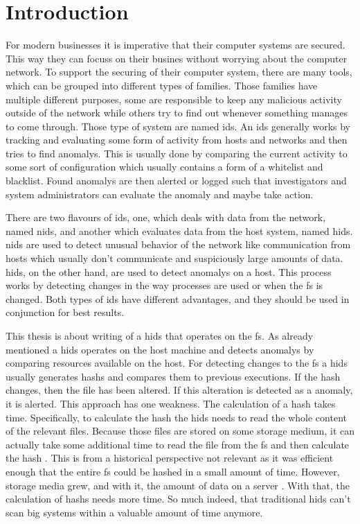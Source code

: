 \chapter{Introduction}

For modern businesses it is imperative that their computer systems are secured. This way they can focuss on their busines without worrying about the computer network. To support the securing of their computer system, there are many tools, which can be grouped into different types of families. Those families have multiple different purposes, some are responsible to keep any malicious activity outside of the network while others try to find out whenever something manages to come through. Those type of system are named \gls{ids}. An \gls{ids} generally works by tracking and evaluating some form of activity from hosts and networks and then tries to find \glspl{anomaly}. This is usually done by comparing the current activity to some sort of configuration which usually contains a form of a whitelist and blacklist. Found \glspl{anomaly} are then alerted or logged such that investigators and system administrators can evaluate the anomaly and maybe take action. 

There are two flavours of \gls{ids}, one, which deals with data from the network, named \gls{nids}, and another which evaluates data from the host system, named \gls{hids}. \gls{nids} are used to detect unusual behavior of the network like communication from hosts which usually don't communicate and suspiciously large amounts of data. \gls{hids}, on the other hand, are used to detect \glspl{anomaly} on a host. This process works by detecting changes in the way processes are used or when the \gls{fs} is changed. Both types of \gls{ids} have different advantages, and they should be used in conjunction for best results. \cite{needed}

This thesis is about writing of a \gls{hids} that operates on the \gls{fs}. As already mentioned a \gls{hids} operates on the host machine and detects \glspl{anomaly} by comparing resources available on the host. For detecting changes to the \gls{fs} a \gls{hids} usually generates \glspl{hash} and compares them to previous executions. If the \gls{hash} changes, then the file has been altered. If this alteration is detected as a \gls{anomaly}, it is alerted. This approach has one weakness. The calculation of a \gls{hash} takes time. Specifically, to calculate the hash the \gls{hids} needs to read the whole content of the relevant files. Because those files are stored on some storage medium, it can actually take some additional time to read the file from the \gls{fs} and then calculate the hash \cite{hash:slow, hash:speed}. This is from a historical perspective not relevant as it was efficient enough that the entire \gls{fs} could be hashed in a small amount of time. However, storage media grew, and with it, the amount of data on a server \cite{bruce:imaging}. With that, the calculation of \glspl{hash} needs more time. So much indeed, that traditional \gls{hids} can't scan big systems within a valuable amount of time anymore.

